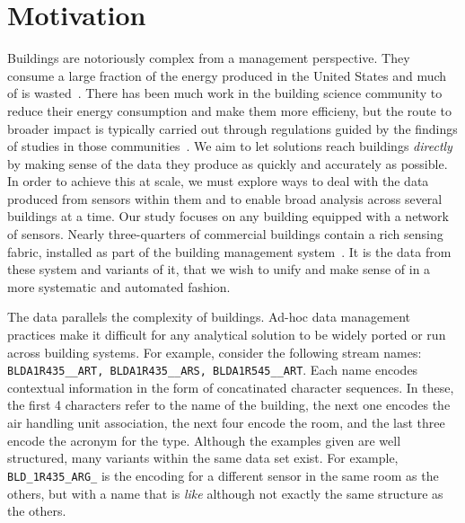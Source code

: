 \section{Motivation}
\label{sec:motivation}

Buildings are notoriously complex from a management perspective.  They consume a large fraction
of the energy produced in the United States and much of is wasted~\cite{epa}.  There has been
much work in the building science community to reduce their energy consumption and make them more
efficieny, but the route to broader impact is typically carried out through regulations guided
by the findings of studies in those communities~\cite{regulation}.
We aim to let solutions reach buildings \emph{directly} by making sense of the data they produce
as quickly and accurately as possible.
In order to achieve this at scale, we must explore ways to deal with the data produced
from sensors within them and to enable broad analysis across several buildings at a time. Our study
focuses on any building equipped with a network of sensors.  Nearly 
three-quarters of commercial buildings contain a rich sensing fabric, installed as part
of the building management system~\cite{study}.  
It is the data from these system and variants of it, that
we wish to unify and make sense of in a more systematic and automated fashion.

%
The data parallels the complexity of buildings. Ad-hoc data management practices
make it difficult for any analytical solution to be widely ported or run across building
systems.  For example, consider the following stream names: \texttt{BLDA1R435\_\_ART,
BLDA1R435\_\_ARS, BLDA1R545\_\_ART}. Each name encodes contextual information in the form
of concatinated character sequences. In these, the first 4 characters refer to the 
name of the building, the next one encodes the air handling unit association, the next 
four encode the room,
and the last three encode the acronym for the type.  Although the examples given are well
structured, many variants within the same data set exist.  For example, \texttt{BLD\_1R435\_ARG\_}
is the encoding for a different sensor in the same room as the others, but with a name
that is \emph{like} although not exactly the same structure as the others.

